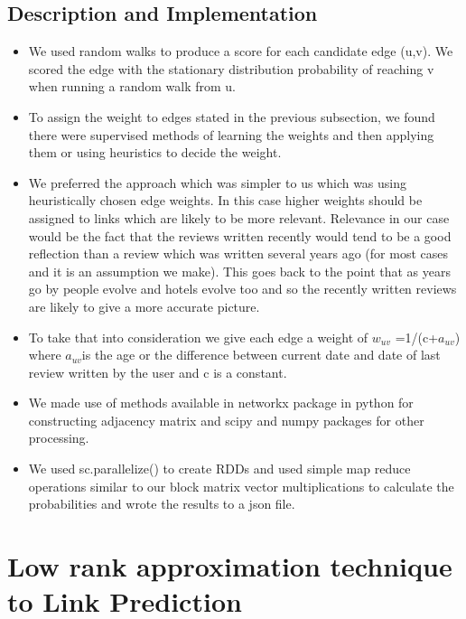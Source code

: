 \documentclass[letterpaper,twocolumn,11pt]{article}
\begin{document}
\subsection{Description and Implementation}
\begin{itemize}
\item We used random walks to produce a score for each candidate edge (u,v). We scored the edge with the stationary distribution probability of reaching v when running a random walk from u.

\item To assign the weight to edges stated in the previous subsection, we found there were supervised methods of learning the weights and then applying them or using heuristics to decide the weight.

\item We preferred the approach which was simpler to us which was using heuristically chosen edge weights. In this case higher weights should be assigned to links which are likely to be more relevant. Relevance in our case would be the fact that the reviews written recently would tend to be a good reflection than a review which was written several years ago (for most cases and it is an assumption we make). This goes back to the point that as years go by people evolve and hotels evolve too and so the recently written reviews are likely to give a more accurate picture.

\item To take that into consideration we give each edge a weight of $w_{uv}$ =1/(c+$a_{uv}$) where $a_{uv} $is the age or the difference between current date and date of last review written by the user and c is a constant. 

\item We made use of methods available in networkx package in python for constructing adjacency matrix and scipy and numpy packages for other processing.

\item We used sc.parallelize() to create RDDs and used simple map reduce operations similar to our block matrix vector multiplications to calculate the probabilities and wrote the results to a json file.

\end{itemize}

\section{Low rank approximation technique to Link Prediction}
\end{document}
